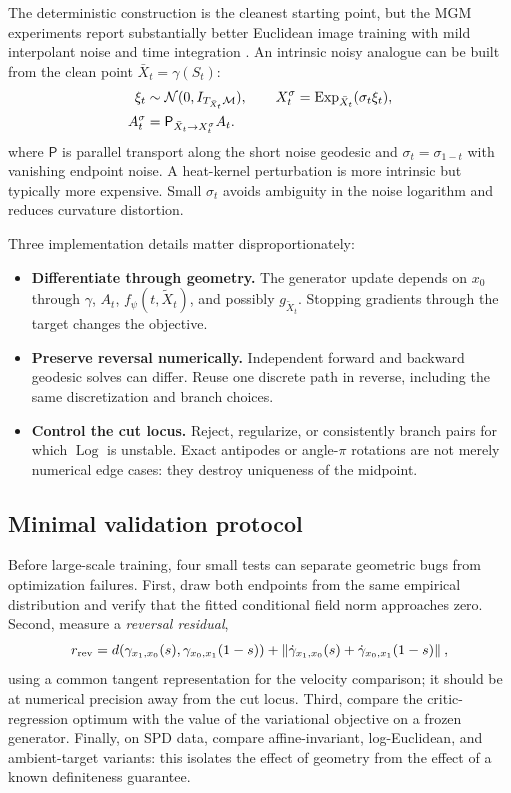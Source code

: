 \documentclass[10pt,twocolumn]{article}
\newcommand{\M}{\mathcal{M}}
\newcommand{\Exp}{\operatorname{Exp}}
\newcommand{\Log}{\operatorname{Log}}
\newcommand{\Normal}{\mathcal{N}}
\newcommand{\norm}[2][]{\left\lVert #2\right\rVert_{#1}}
\begin{document}
The deterministic construction is the cleanest starting point, but the MGM experiments report substantially better Euclidean image training with mild interpolant noise and time integration \citep{shlenskii2026midpoint}. An intrinsic noisy analogue can be built from the clean point $\bar X_t=\gamma(S_t)$:
\begin{align}
 \xi_t&\sim\Normal(0,I_{T_{\bar X_t}\M}),\qquad
 X_t^\sigma=\Exp_{\bar X_t}(\sigma_t\xi_t),\notag\\
 A_t^\sigma&=\mathsf P_{\bar X_t\to X_t^\sigma}A_t.
 \label{eq:noisy}
\end{align}
where $\mathsf P$ is parallel transport along the short noise geodesic and $\sigma_t=\sigma_{1-t}$ with vanishing endpoint noise. A heat-kernel perturbation is more intrinsic but typically more expensive. Small $\sigma_t$ avoids ambiguity in the noise logarithm and reduces curvature distortion.

Three implementation details matter disproportionately:
\begin{itemize}
 \item \textbf{Differentiate through geometry.} The generator update depends on $x_0$ through $\gamma$, $A_t$, $f_\psi(t,\widetilde X_t)$, and possibly $g_{\widetilde X_t}$. Stopping gradients through the target changes the objective.
 \item \textbf{Preserve reversal numerically.} Independent forward and backward geodesic solves can differ. Reuse one discrete path in reverse, including the same discretization and branch choices.
 \item \textbf{Control the cut locus.} Reject, regularize, or consistently branch pairs for which $\Log$ is unstable. Exact antipodes or angle-$\pi$ rotations are not merely numerical edge cases: they destroy uniqueness of the midpoint.
\end{itemize}

\subsection{Minimal validation protocol}
Before large-scale training, four small tests can separate geometric bugs from optimization failures. First, draw both endpoints from the same empirical distribution and verify that the fitted conditional field norm approaches zero. Second, measure a \emph{reversal residual},
\begin{equation}
 r_{\rm rev}=d\!\left(\gamma_{x_1,x_0}(s),\gamma_{x_0,x_1}(1-s)\right)
 +\norm{\dot\gamma_{x_1,x_0}(s)+\dot\gamma_{x_0,x_1}(1-s)},
\end{equation}
using a common tangent representation for the velocity comparison; it should be at numerical precision away from the cut locus. Third, compare the critic-regression optimum with the value of the variational objective on a frozen generator. Finally, on SPD data, compare affine-invariant, log-Euclidean, and ambient-target variants: this isolates the effect of geometry from the effect of a known definiteness guarantee.
\end{document}

